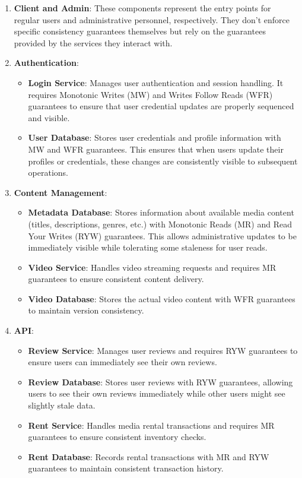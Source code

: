 \begin{enumerate}
  \item \textbf{Client and Admin}: These components represent the
    entry points for regular users and administrative personnel,
    respectively. They don't enforce specific consistency guarantees
    themselves but rely on the guarantees provided by the services
    they interact with.

  \item \textbf{Authentication}:
    \begin{itemize}
      \item \textbf{Login Service}: Manages user authentication and
        session handling. It requires Monotonic Writes (MW) and
        Writes Follow Reads (WFR) guarantees to ensure that user
        credential updates are properly sequenced and visible.
      \item \textbf{User Database}: Stores user credentials and
        profile information with MW and WFR guarantees. This ensures
        that when users update their profiles or credentials, these
        changes are consistently visible to subsequent operations.
    \end{itemize}

  \item \textbf{Content Management}:
    \begin{itemize}
      \item \textbf{Metadata Database}: Stores information about
        available media content (titles, descriptions, genres, etc.)
        with Monotonic Reads (MR) and Read Your Writes (RYW)
        guarantees. This allows administrative updates to be
        immediately visible while tolerating some staleness for user reads.
      \item \textbf{Video Service}: Handles video streaming requests
        and requires MR guarantees to ensure consistent content delivery.
      \item \textbf{Video Database}: Stores the actual video content
        with WFR guarantees to maintain version consistency.
    \end{itemize}

  \item \textbf{API}:
    \begin{itemize}
      \item \textbf{Review Service}: Manages user reviews and
        requires RYW guarantees to ensure users can immediately see
        their own reviews.
      \item \textbf{Review Database}: Stores user reviews with RYW
        guarantees, allowing users to see their own reviews
        immediately while other users might see slightly stale data.
      \item \textbf{Rent Service}: Handles media rental transactions
        and requires MR guarantees to ensure consistent inventory checks.
      \item \textbf{Rent Database}: Records rental transactions with
        MR and RYW guarantees to maintain consistent transaction history.
    \end{itemize}
\end{enumerate}

